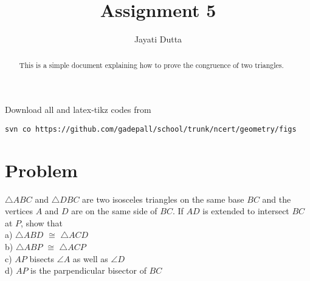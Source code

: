 \documentclass[journal,12pt,twocolumn]{IEEEtran}
\begin{document}
\let\StandardTheFigure\thefigure
\let\vec\mathbf
\renewcommand{\thefigure}{\theproblem}



\def\putbox#1#2#3{\makebox[0in][l]{\makebox[#1][l]{}\raisebox{\baselineskip}[0in][0in]{\raisebox{#2}[0in][0in]{#3}}}}
     \def\rightbox#1{\makebox[0in][r]{#1}}
     \def\centbox#1{\makebox[0in]{#1}}
     \def\topbox#1{\raisebox{-\baselineskip}[0in][0in]{#1}}
     \def\midbox#1{\raisebox{-0.5\baselineskip}[0in][0in]{#1}}

\vspace{3cm}


\title{Assignment 5}
\author{Jayati Dutta}





\maketitle

\newpage


\bigskip

\renewcommand{\thefigure}{\theenumi}
\renewcommand{\thetable}{\theenumi}


\begin{abstract}
This is a simple document explaining how to prove the congruence of two triangles.
\end{abstract}

%

Download all and latex-tikz codes from 
%
\begin{lstlisting}
svn co https://github.com/gadepall/school/trunk/ncert/geometry/figs
\end{lstlisting}
%


\section{Problem}
$\triangle ABC$ and $\triangle DBC$ are two isosceles triangles on the same base $BC$ and the vertices $A$ and $D$ are on the same side of $BC$. If $AD$ is extended to intersect $BC$ at $P$, show that \\
a) $\triangle ABD$ $\cong$ $\triangle ACD$ \\
b) $\triangle ABP$ $\cong$ $\triangle ACP$ \\
c) $AP$ bisects $\angle A$ as well as $\angle D$\\
d) $AP$ is the parpendicular bisector of $BC$
\end{document}
